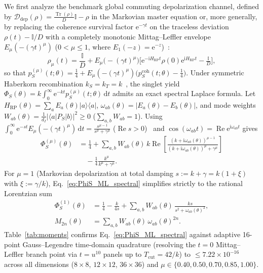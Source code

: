 \documentclass[twocolumn,10pt,amsmath,amssymb,floatfix]{revtex4-2}
\theoremstyle{plain}
\theoremstyle{definition}
\newcommand{\dd}{\mathrm{d}}
\newcommand{\ii}{\mathrm{i}}
\newcommand{\ee}{\mathrm{e}}
\newcommand{\Tr}{\operatorname{Tr}}
\newcommand{\PS}{P_S}
\newcommand{\HRP}{H_{\mathrm{RP}}}
\begin{document}
We first analyze the benchmark global commuting depolarization channel, defined by $\mathcal{D}_{\mathrm{dep}}(\rho) = \frac{\Tr(\rho)}{D}\mathbb{I} - \rho$ in the Markovian master equation or, more generally, by replacing the coherence survival factor $\ee^{-\gamma t}$ on the traceless deviation $\rho(t) - \mathbb{I}/D$ with a completely monotonic Mittag--Leffler envelope $E_\mu(-(\gamma t)^\mu)$ ($0 < \mu \le 1$, where $E_1(-z) = \ee^{-z}$)~\cite{Gorenflo2002FCAA,Pollard1948BAMS,Metzler2000PR}:
\begin{equation}
\label{eq:ML_state}
\rho_\mu(t) = \frac{\mathbb{I}}{D} + E_\mu\bigl(-(\gamma t)^\mu\bigr)\bigl[\ee^{-\ii\HRP t}\rho(0)\ee^{\ii\HRP t} - \tfrac{\mathbb{I}}{D}\bigr],
\end{equation}
so that $p_S^{(\mu)}(t;\theta) = \frac{1}{4} + E_\mu(-(\gamma t)^\mu)\bigl(p_S^{\mathrm{coh}}(t;\theta) - \frac{1}{4}\bigr)$.
Under symmetric Haberkorn recombination $k_S = k_T = k$~\cite{Haberkorn1976MolPhys}, the singlet yield $\Phi_S(\theta) = k\int_0^\infty \ee^{-kt} p_S^{(\mu)}(t;\theta)\,\dd t$ admits an exact spectral Laplace formula. Let $\HRP(\theta) = \sum_a E_a(\theta)|a\rangle\langle a|$, $\omega_{ab}(\theta) = |E_a(\theta)-E_b(\theta)|$, and mode weights $W_{ab}(\theta) = \frac{1}{d_I}|\langle a|\PS|b\rangle|^2 \ge 0$ ($\sum_{a,b} W_{ab} = 1$). Using $\int_0^\infty \ee^{-st} E_\mu(-(\gamma t)^\mu)\,\dd t = \frac{s^{\mu-1}}{s^\mu + \gamma^\mu}$ ($\operatorname{Re} s > 0$)~\cite{Gorenflo2002FCAA} and $\cos(\omega_{ab}t) = \operatorname{Re}\ee^{\ii\omega_{ab}t}$ gives
\begin{align}
\label{eq:PhiS_ML_spectral}
\Phi_S^{(\mu)}(\theta) &= \frac{1}{4} + \sum_{a,b} W_{ab}(\theta)\, k \operatorname{Re}\!\left[\frac{(k + \ii\omega_{ab}(\theta))^{\mu-1}}{(k+\ii\omega_{ab}(\theta))^\mu + \gamma^\mu}\right] \nonumber\\
&\quad - \frac{1}{4}\frac{k^\mu}{k^\mu + \gamma^\mu}.
\end{align}
For $\mu = 1$ (Markovian depolarization at total damping $s := k + \gamma = k(1+\xi)$ with $\xi := \gamma/k$), Eq.~\eqref{eq:PhiS_ML_spectral} simplifies strictly to the rational Lorentzian sum
\begin{align}
\label{eq:PhiS_Markov_spectral}
\Phi_S^{(1)}(\theta) &= \frac{1}{4} - \frac{k}{4s} + \sum_{a,b} W_{ab}(\theta)\,\frac{k s}{s^2 + \omega_{ab}(\theta)^2}, \nonumber\\
M_{2n}(\theta) &= \sum_{a,b} W_{ab}(\theta)\,\omega_{ab}(\theta)^{2n}.
\end{align}
Table~\ref{tab:moments} confirms Eq.~\eqref{eq:PhiS_ML_spectral} against adaptive 16-point Gauss--Legendre time-domain quadrature (resolving the $t=0$ Mittag--Leffler branch point via $t = u^{10}$ panels up to $T_{\mathrm{cut}} = 42/k$) to $\le 7.22 \times 10^{-16}$ across all dimensions ($8\times 8$, $12\times 12$, $36\times 36$) and $\mu \in \{0.40, 0.50, 0.70, 0.85, 1.00\}$.
\end{document}
